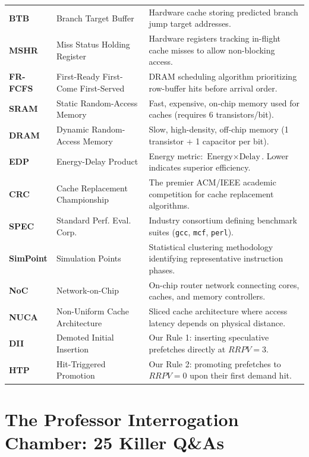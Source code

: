 \documentclass[11pt, a4paper]{article}
\begin{document}
\begin{center}
\begin{tabularx}{\textwidth}{@{}l >{\raggedright\arraybackslash}p{4.0cm} >{\raggedright\arraybackslash}X@{}}
\textbf{BTB} & Branch Target Buffer & Hardware cache storing predicted branch jump target addresses. \\
\textbf{MSHR} & Miss Status Holding Register & Hardware registers tracking in-flight cache misses to allow non-blocking access. \\
\textbf{FR-FCFS} & First-Ready First-Come First-Served & DRAM scheduling algorithm prioritizing row-buffer hits before arrival order. \\
\textbf{SRAM} & Static Random-Access Memory & Fast, expensive, on-chip memory used for caches (requires 6 transistors/bit). \\
\textbf{DRAM} & Dynamic Random-Access Memory & Slow, high-density, off-chip memory (1 transistor + 1 capacitor per bit). \\
\textbf{EDP} & Energy-Delay Product & Energy metric: $\text{Energy} \times \text{Delay}$. Lower indicates superior efficiency. \\
\textbf{CRC} & Cache Replacement Championship & The premier ACM/IEEE academic competition for cache replacement algorithms. \\
\textbf{SPEC} & Standard Perf. Eval. Corp. & Industry consortium defining benchmark suites (\texttt{gcc}, \texttt{mcf}, \texttt{perl}). \\
\textbf{SimPoint} & Simulation Points & Statistical clustering methodology identifying representative instruction phases. \\
\textbf{NoC} & Network-on-Chip & On-chip router network connecting cores, caches, and memory controllers. \\
\textbf{NUCA} & Non-Uniform Cache Architecture & Sliced cache architecture where access latency depends on physical distance. \\
\textbf{DII} & Demoted Initial Insertion & Our Rule 1: inserting speculative prefetches directly at $RRPV=3$. \\
\textbf{HTP} & Hit-Triggered Promotion & Our Rule 2: promoting prefetches to $RRPV=0$ upon their first demand hit. \\
\bottomrule
\end{tabularx}
\end{center}

\newpage

\section{The Professor Interrogation Chamber: 25 Killer Q\&As}
\end{document}

